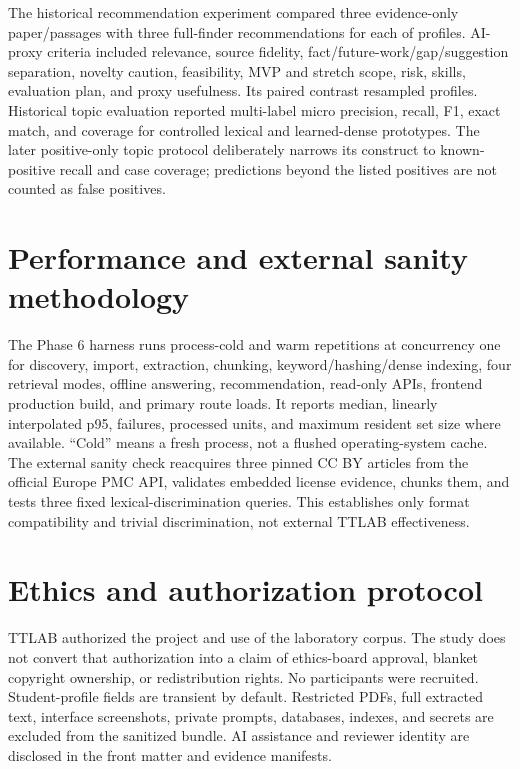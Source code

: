 The historical recommendation experiment compared three evidence-only paper/passages with three full-finder recommendations for each of \RecommendationProfileCount{} profiles. AI-proxy criteria included relevance, source fidelity, fact/future-work/gap/suggestion separation, novelty caution, feasibility, MVP and stretch scope, risk, skills, evaluation plan, and proxy usefulness. Its paired contrast resampled profiles. Historical topic evaluation reported multi-label micro precision, recall, F1, exact match, and coverage for controlled lexical and learned-dense prototypes. The later positive-only topic protocol deliberately narrows its construct to known-positive recall and case coverage; predictions beyond the listed positives are not counted as false positives.

\section{Performance and external sanity methodology}

The Phase 6 harness runs process-cold and warm repetitions at concurrency one for discovery, import, extraction, chunking, keyword/hashing/dense indexing, four retrieval modes, offline answering, recommendation, read-only APIs, frontend production build, and primary route loads. It reports median, linearly interpolated p95, failures, processed units, and maximum resident set size where available. ``Cold'' means a fresh process, not a flushed operating-system cache. The external sanity check reacquires three pinned CC BY articles from the official Europe PMC API, validates embedded license evidence, chunks them, and tests three fixed lexical-discrimination queries. This establishes only format compatibility and trivial discrimination, not external TTLAB effectiveness.

\section{Ethics and authorization protocol}

TTLAB authorized the project and use of the laboratory corpus. The study does not convert that authorization into a claim of ethics-board approval, blanket copyright ownership, or redistribution rights. No participants were recruited. Student-profile fields are transient by default. Restricted PDFs, full extracted text, interface screenshots, private prompts, databases, indexes, and secrets are excluded from the sanitized bundle. AI assistance and reviewer identity are disclosed in the front matter and evidence manifests.
